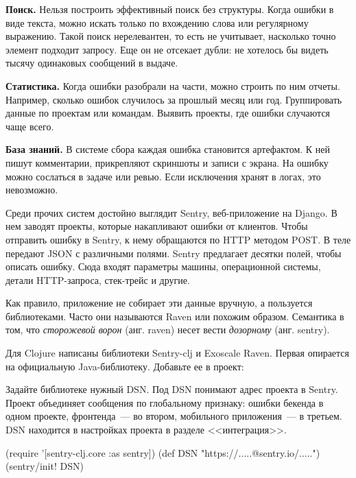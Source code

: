 \textbf{Поиск.} Нельзя построить эффективный поиск без структуры. Когда ошибки в
виде текста, можно искать только по вхождению слова или регулярному
выражению. Такой поиск нерелевантен, то есть не учитывает, насколько точно
элемент подходит запросу. Еще он не отсекает дубли: не хотелось бы видеть тысячу
одинаковых сообщений в выдаче.

\textbf{Статистика.} Когда ошибки разобрали на части, можно строить по ним
отчеты. Например, сколько ошибок случилось за прошлый месяц или
год. Группировать данные по проектам или командам. Выявить проекты, где ошибки
случаются чаще всего.

\textbf{База знаний.} В системе сбора каждая ошибка становится артефактом. К ней
пишут комментарии, прикрепляют скриншоты и записи с экрана. На ошибку можно
сослаться в задаче или ревью. Если исключения хранят в логах, это невозможно.

Среди прочих систем достойно выглядит Sentry,
веб-приложение на Django. В нем заводят проекты, которые накапливают ошибки от
клиентов. Чтобы отправить ошибку в Sentry, к нему обращаются по HTTP методом
POST. В теле передают JSON с различными полями. Sentry предлагает десятки полей,
чтобы описать ошибку. Сюда входят параметры машины, операционной системы, детали
HTTP-запроса, стек-трейс и другие.

Как правило, приложение не собирает эти данные вручную, а пользуется
библиотеками. Часто они называются Raven или похожим образом. Семантика в том,
что \emph{сторожевой ворон} (анг. raven) несет вести \emph{дозорному}
(анг. sentry).

Для Clojure написаны библиотеки Sentry-clj
и Exoscale Raven. Первая опирается
на официальную Java-библиотеку. Добавьте ее в проект:

\begin{english}
  \begin{clojure}
  \end{clojure}
\end{english}

Задайте библиотеке нужный DSN. Под DSN понимают адрес проекта в Sentry. Проект
объединяет сообщения по глобальному признаку: ошибки бекенда в одном проекте,
фронтенда~--- во втором, мобильного приложения~--- в третьем. DSN находится в
настройках проекта в разделе <<интеграция>>.

\begin{english}
  \begin{clojure}
(require '[sentry-clj.core :as sentry])
(def DSN "https://.....@sentry.io/.....")
(sentry/init! DSN)
  \end{clojure}
\end{english}

